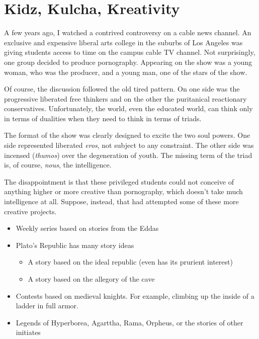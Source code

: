 \section{Kidz, Kulcha, Kreativity}

A few years ago, I watched a contrived controversy on a cable news channel. An exclusive and expensive liberal arts college in the suburbs of Los Angeles was giving students access to time on the campus cable TV channel. Not surprisingly, one group decided to produce pornography. Appearing on the show was a young woman, who was the producer, and a young man, one of the stars of the show.

Of course, the discussion followed the old tired pattern. On one side was the progressive liberated free thinkers and on the other the puritanical reactionary conservatives. Unfortunately, the world, even the educated world, can think only in terms of dualities when they need to think in terms of triads.

The format of the show was clearly designed to excite the two soul powers. One side represented liberated \emph{eros}, not subject to any constraint. The other side was incensed (\emph{thumos}) over the degeneration of youth. The missing term of the triad is, of course,
\emph{nous}, the intelligence.


The disappointment is that these privileged students could not conceive of anything higher or more creative than pornography, which doesn't take much intelligence at all. Suppose, instead, that had attempted some of these more creative projects.

\begin{itemize}
\item Weekly series based on stories from the Eddas

\item Plato's Republic has many story ideas

\begin{itemize}
\item A story based on the ideal republic (even has its prurient interest)
  
\item A story based on the allegory of the cave
\end{itemize}


\item Contests based on medieval knights. For example, climbing up the inside of a ladder in full armor.

\item Legends of Hyperborea, Agarttha, Rama, Orpheus, or the stories of other initiates
\end{itemize}


